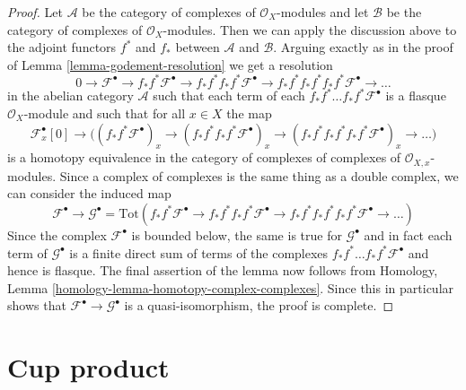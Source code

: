\begin{proof}
Let $\mathcal{A}$ be the category of complexes of $\mathcal{O}_X$-modules
and let $\mathcal{B}$ be the category of complexes of $\mathcal{O}_X$-modules.
Then we can apply the discussion above to the adjoint functors
$f^*$ and $f_*$ between $\mathcal{A}$ and $\mathcal{B}$.
Arguing exactly as in the proof of
Lemma \ref{lemma-godement-resolution}
we get a resolution
$$
0 \to
\mathcal{F}^\bullet \to
f_*f^*\mathcal{F}^\bullet \to
f_*f^*f_*f^*\mathcal{F}^\bullet \to
f_*f^*f_*f^*f_*f^*\mathcal{F}^\bullet \to \ldots
$$
in the abelian category $\mathcal{A}$ such that each term of each
$f_*f^*\ldots f_*f^*\mathcal{F}^\bullet$ is a flasque
$\mathcal{O}_X$-module and such that for all $x \in X$ the
map
$$
\mathcal{F}^\bullet_x[0] \to \Big(
(f_*f^*\mathcal{F}^\bullet)_x \to
(f_*f^*f_*f^*\mathcal{F}^\bullet)_x \to
(f_*f^*f_*f^*f_*f^*\mathcal{F}^\bullet)_x \to \ldots
\Big)
$$
is a homotopy equivalence in the category of complexes of complexes
of $\mathcal{O}_{X, x}$-modules. Since a complex of complexes is the
same thing as a double complex, we can consider the induced map
$$
\mathcal{F}^\bullet \to
\mathcal{G}^\bullet =
\text{Tot}(
f_*f^*\mathcal{F}^\bullet \to
f_*f^*f_*f^*\mathcal{F}^\bullet \to
f_*f^*f_*f^*f_*f^*\mathcal{F}^\bullet \to \ldots
)
$$
Since the complex $\mathcal{F}^\bullet$ is bounded below, the
same is true for $\mathcal{G}^\bullet$ and in fact each term
of $\mathcal{G}^\bullet$ is a finite direct sum of
terms of the complexes $f_*f^*\ldots f_*f^*\mathcal{F}^\bullet$
and hence is flasque. The final assertion of the lemma
now follows from
Homology, Lemma \ref{homology-lemma-homotopy-complex-complexes}.
Since this in particular shows that
$\mathcal{F}^\bullet \to \mathcal{G}^\bullet$
is a quasi-isomorphism, the proof is complete.
\end{proof}














\section{Cup product}
\label{section-cup-product}

